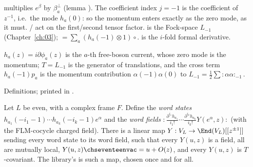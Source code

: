 \begin{dictionary}
 multiplies $e^\beta$ by $\beta^\perp_a$ (lemma ).  The
coefficient index $j=-1$ is the coefficient of $z^{-1}$, i.e.\ the mode $h_a(0)$: so the momentum enters
exactly as the zero mode, as it must.  / act on the first/second tensor factor.
 is the Fock-space $L_{-1}$ (Chapter~\ref{ch:03}); 
$=\sum_a(h_a(-1)\otimes1)\circ$.   is the $i$-fold formal derivative.
\end{dictionary}

\begin{physics}
$h_a(z)=i\partial\phi_a(z)$ is the $a$-th free-boson current, whose zero mode is the momentum; $T=L_{-1}$ is
the generator of translations, and the cross term $h_a(-1)p_a$ is the momentum contribution
$\alpha(-1)\alpha(0)$ to $L_{-1}=\frac12\sum{:}\alpha\alpha{:}_{-1}$.
\end{physics}

\begin{status}
Definitions; printed in .
\end{status}

\begin{theorem}\label{ch17:thm:reconstruct}
Let $L$ be even, with a complex frame $F$.  Define the \emph{word states}
$h_{a_1}(-i_1-1)\cdots h_{a_k}(-i_k-1)e^\alpha$ and the \emph{word fields}
${:}\tfrac{\partial^{i_1}h_{a_1}}{i_1!}\cdots\tfrac{\partial^{i_k}h_{a_k}}{i_k!}Y(e^\alpha,z){:}$ (with the FLM-cocycle charged
field).  There is a linear map $Y:V_L\to\End(V_L)[[z^{\pm1}]]$ sending every word state to its word field,
such that every $Y(u,z)$ is a field, all are mutually local, $Y(u,z)\chseventeenvac=u+O(z)$, and every $Y(u,z)$ is
$T$-covariant.  The library's  is such a map, chosen once and for all.
\end{theorem}

